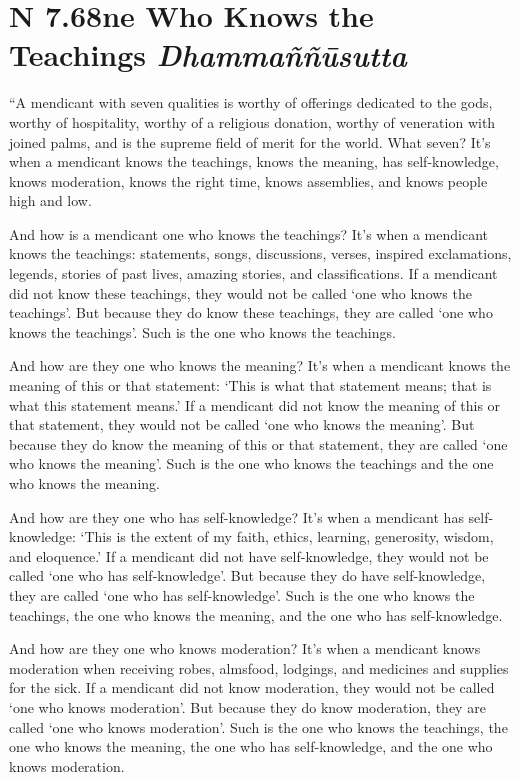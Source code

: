 \documentclass[12pt,openany]{book}%
\newcommand*{\suttatitleacronym}[1]{\smaller[2]{#1}\vspace*{.3em}}
\newcommand*{\suttatitletranslation}[1]{\linebreak{#1}}
\newcommand*{\suttatitleroot}[1]{\linebreak\smaller[2]\itshape{#1}}
\newcommand*{\tocacronym}[1]{\hspace*{-3.3em}{#1}\quad}
\newcommand*{\toctranslation}[1]{#1}
\newcommand*{\tocroot}[1]{(\textit{#1})}
\begin{document}
%
\section*{{\suttatitleacronym AN 7.68}{\suttatitletranslation One Who Knows the Teachings }{\suttatitleroot Dhammaññūsutta}}
\addcontentsline{toc}{section}{\tocacronym{AN 7.68} \toctranslation{One Who Knows the Teachings } \tocroot{Dhammaññūsutta}}

“A mendicant with seven qualities is worthy of offerings dedicated to the gods, worthy of hospitality, worthy of a religious donation, worthy of veneration with joined palms, and is the supreme field of merit for the world. What seven? It’s when a mendicant knows the teachings, knows the meaning, has self-knowledge, knows moderation, knows the right time, knows assemblies, and knows people high and low. 

And how is a mendicant one who knows the teachings? It’s when a mendicant knows the teachings: statements, songs, discussions, verses, inspired exclamations, legends, stories of past lives, amazing stories, and classifications. If a mendicant did not know these teachings, they would not be called ‘one who knows the teachings’. But because they do know these teachings, they are called ‘one who knows the teachings’. Such is the one who knows the teachings. 

And how are they one who knows the meaning? It’s when a mendicant knows the meaning of this or that statement: ‘This is what that statement means; that is what this statement means.’ If a mendicant did not know the meaning of this or that statement, they would not be called ‘one who knows the meaning’. But because they do know the meaning of this or that statement, they are called ‘one who knows the meaning’. Such is the one who knows the teachings and the one who knows the meaning. 

And how are they one who has self-knowledge? It’s when a mendicant has self-knowledge: ‘This is the extent of my faith, ethics, learning, generosity, wisdom, and eloquence.’ If a mendicant did not have self-knowledge, they would not be called ‘one who has self-knowledge’. But because they do have self-knowledge, they are called ‘one who has self-knowledge’. Such is the one who knows the teachings, the one who knows the meaning, and the one who has self-knowledge. 

And how are they one who knows moderation? It’s when a mendicant knows moderation when receiving robes, almsfood, lodgings, and medicines and supplies for the sick. If a mendicant did not know moderation, they would not be called ‘one who knows moderation’. But because they do know moderation, they are called ‘one who knows moderation’. Such is the one who knows the teachings, the one who knows the meaning, the one who has self-knowledge, and the one who knows moderation. 
\end{document}
